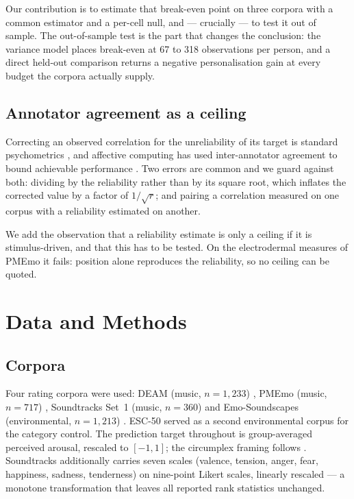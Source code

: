 Our contribution is to estimate that break-even point on three corpora with a
common estimator and a per-cell null, and --- crucially --- to test it out of
sample. The out-of-sample test is the part that changes the conclusion: the
variance model places break-even at 67 to 318 observations per person, and a
direct held-out comparison returns a negative personalisation gain at every
budget the corpora actually supply.

\subsection{Annotator agreement as a ceiling}

Correcting an observed correlation for the unreliability of its target is
standard psychometrics \cite{spearman1904, nunnally1994}, and affective
computing has used inter-annotator agreement to bound achievable performance
\cite{grimm2007primitives}. Two errors are common and we guard against both:
dividing by the reliability rather than by its square root, which inflates the
corrected value by a factor of $1/\sqrt{r}$; and pairing a correlation
measured on one corpus with a reliability estimated on another.

We add the observation that a reliability estimate is only a ceiling if it is
stimulus-driven, and that this has to be tested. On the electrodermal measures
of PMEmo it fails: position alone reproduces the reliability, so no ceiling
can be quoted.

\section{Data and Methods}

\subsection{Corpora}

Four rating corpora were used: DEAM (music, $n = 1{,}233$)
\cite{aljanaki2017}, PMEmo (music, $n = 717$) \cite{zhang2018pmemo},
Soundtracks Set~1 (music, $n = 360$) \cite{eerola2011} and Emo-Soundscapes
(environmental, $n = 1{,}213$) \cite{fan2017emo}. ESC-50 \cite{piczak2015}
served as a second environmental corpus for the category control. The
prediction target throughout is group-averaged perceived arousal, rescaled to
$[-1, 1]$; the circumplex framing follows \cite{russell1980, eerola2013}.
Soundtracks additionally carries seven scales (valence, tension, anger, fear,
happiness, sadness, tenderness) on nine-point Likert scales, linearly
rescaled --- a monotone transformation that leaves all reported rank
statistics unchanged.

